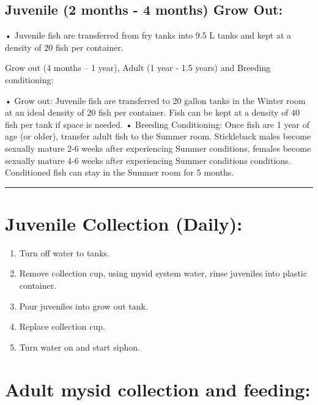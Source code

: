 \documentclass[
]{book}
\begin{document}
\hypertarget{juvenile-2-months---4-months-grow-out}{%
\subsection{Juvenile (2 months - 4 months) Grow Out:}\label{juvenile-2-months---4-months-grow-out}}

• Juvenile fish are transferred from fry tanks into 9.5 L tanks and kept at a density of 20 fish per container.

Grow out (4 months -- 1 year), Adult (1 year - 1.5 years) and Breeding conditioning:

• Grow out: Juvenile fish are transferred to 20 gallon tanks in the Winter room at an ideal density of 20 fish per container. Fish can be kept at a density of 40 fish per tank if space is needed.
• Breeding Conditioning: Once fish are 1 year of age (or older), transfer adult fish to the Summer room. Stickleback males become sexually mature 2-6 weeks after experiencing Summer conditions, females become sexually mature 4-6 weeks after experiencing Summer conditions conditions. Conditioned fish can stay in the Summer room for 5 months.

\begin{center}\rule{0.5\linewidth}{0.5pt}\end{center}

\hypertarget{juvenile-collection-daily}{%
\section{Juvenile Collection (Daily):}\label{juvenile-collection-daily}}

\begin{enumerate}
\def\labelenumi{\arabic{enumi}.}
\item
  Turn off water to tanks.
\item
  Remove collection cup, using mysid system water, rinse juveniles into plastic container.
\item
  Pour juveniles into grow out tank.
\item
  Replace collection cup.
\item
  Turn water on and start siphon.
\end{enumerate}

\hypertarget{adult-mysid-collection-and-feeding}{%
\section{Adult mysid collection and feeding:}\label{adult-mysid-collection-and-feeding}}
\end{document}
